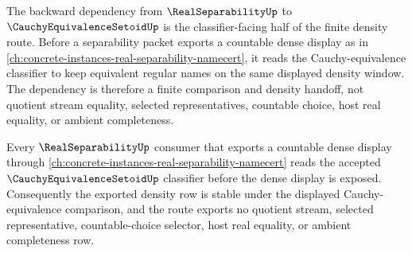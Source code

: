 The backward dependency from $\RealSeparabilityUp$ to $\CauchyEquivalenceSetoidUp$ is the classifier-facing half of the finite density route. Before a separability packet exports a countable dense display as in \autoref{ch:concrete-instances-real-separability-namecert}, it reads the Cauchy-equivalence classifier to keep equivalent regular names on the same displayed density window. The dependency is therefore a finite comparison and density handoff, not quotient stream equality, selected representatives, countable choice, host real equality, or ambient completeness.

\begin{proposition}
\label{prop:cauchy-equivalence-setoid-real-separability-backward-dependency}
Every $\RealSeparabilityUp$ consumer that exports a countable dense display through \autoref{ch:concrete-instances-real-separability-namecert} reads the accepted $\CauchyEquivalenceSetoidUp$ classifier before the dense display is exposed. Consequently the exported density row is stable under the displayed Cauchy-equivalence comparison, and the route exports no quotient stream, selected representative, countable-choice selector, host real equality, or ambient completeness row.
\end{proposition}
